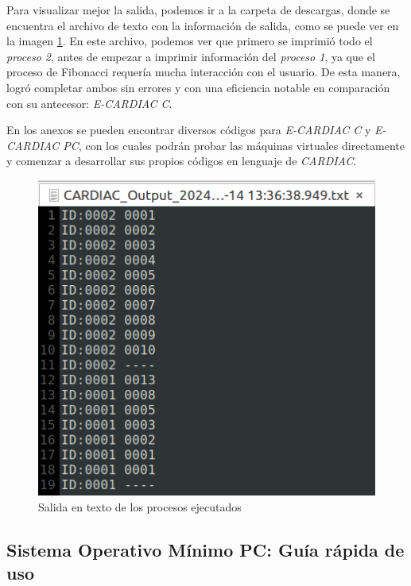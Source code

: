 \documentclass[letterpaper,12pt,oneside]{book}
\begin{document}
		\newpage
			Para visualizar mejor la salida, podemos ir a la carpeta de descargas, donde se encuentra el archivo 
			de texto con la información de salida, como se puede ver en la imagen \ref{fig:ouput_vm_pintor_fibonacci}. 
			En este archivo, podemos ver que primero se imprimió todo
			el \textit{proceso 2}, antes de empezar a 
			imprimir información del \textit{proceso 1}, ya que el proceso de Fibonacci requería mucha interacción
			con el usuario. De esta manera, logró completar ambos sin errores y con una eficiencia notable en comparación
			con su antecesor: \textit{E-CARDIAC C}.
			
			
			En los anexos se pueden encontrar diversos códigos para \textit{E-CARDIAC C} y \textit{E-CARDIAC PC}, con los cuales podrán
			probar las máquinas virtuales directamente y comenzar a desarrollar sus propios códigos en lenguaje de \textit{CARDIAC}.
			
			 
			
			\begin{figure}[h]		
				\centering
				\includegraphics[scale=0.6]{media/Paralela/ouput_vm_pintor_fibonacci.png}
				\caption{Salida en texto de los procesos ejecutados}
				\label{fig:ouput_vm_pintor_fibonacci}
			\end{figure}
			
		\clearpage	 	
	 	
	 	\subsection{Sistema Operativo Mínimo PC: Guía rápida de uso}
			
\end{document}
